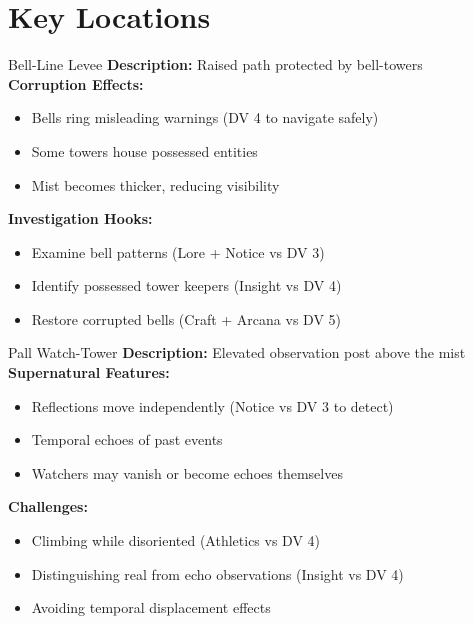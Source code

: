 \documentclass[11pt]{article}
\begin{document}
\section*{Key Locations}

\begin{locationbox}{Bell-Line Levee}
    \textbf{Description:} Raised path protected by bell-towers \\
    \textbf{Corruption Effects:}
    \begin{itemize}
        \item Bells ring misleading warnings (DV 4 to navigate safely)
        \item Some towers house possessed entities
        \item Mist becomes thicker, reducing visibility
    \end{itemize}
    \textbf{Investigation Hooks:}
    \begin{itemize}
        \item Examine bell patterns (Lore + Notice vs DV 3)
        \item Identify possessed tower keepers (Insight vs DV 4)
        \item Restore corrupted bells (Craft + Arcana vs DV 5)
    \end{itemize}
\end{locationbox}

\begin{locationbox}{Pall Watch-Tower}
    \textbf{Description:} Elevated observation post above the mist \\
    \textbf{Supernatural Features:}
    \begin{itemize}
        \item Reflections move independently (Notice vs DV 3 to detect)
        \item Temporal echoes of past events
        \item Watchers may vanish or become echoes themselves
    \end{itemize}
    \textbf{Challenges:}
    \begin{itemize}
        \item Climbing while disoriented (Athletics vs DV 4)
        \item Distinguishing real from echo observations (Insight vs DV 4)
        \item Avoiding temporal displacement effects
    \end{itemize}
\end{locationbox}
\end{document}
